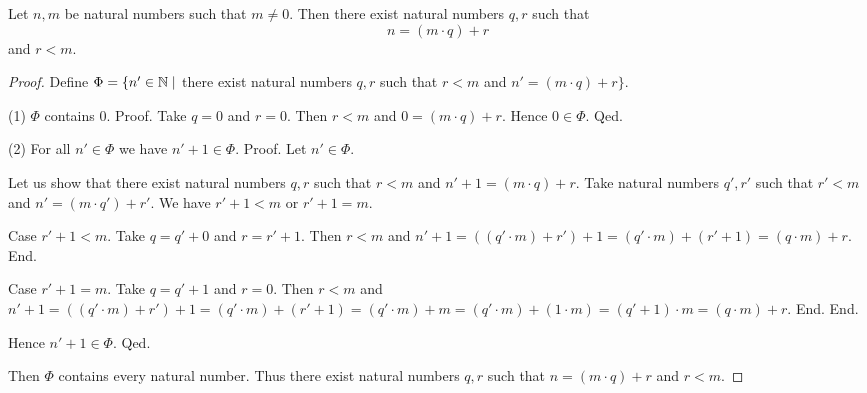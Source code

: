 \documentclass[../arithmetic.tex]{subfiles}
\begin{document}
  \begin{forthel}
    \begin{theorem}
      Let $n, m$ be natural numbers such that $m \neq 0$.
      Then there exist natural numbers $q, r$ such that
      \[ n = (m \cdot q) \plus r \] and $r \less m$.
    \end{theorem}
    \begin{proof}
      Define $\Phi = \{ n' \in \mathbb{N} \mid$ there exist natural numbers $q, r$
      such that $r \less m$ and $n' = (m \cdot q) \plus r \}$.

      (1) $\Phi$ contains $0$.
      Proof.
        Take $q = 0$ and $r = 0$.
        Then $r \less m$ and $0 = (m \cdot q) \plus r$.
        Hence $0 \in \Phi$.
      Qed.

      (2) For all $n' \in \Phi$ we have $n' \plus 1 \in \Phi$.
      Proof.
        Let $n' \in \Phi$.

        Let us show that there exist natural numbers $q, r$ such that $r \less m$
        and $n' \plus 1 = (m \cdot q) \plus r$.
          Take natural numbers $q', r'$ such that $r' \less m$ and
          $n' = (m \cdot q') \plus r'$.
          We have $r' \plus 1 \less m$ or $r' \plus 1 = m$.

          Case $r' \plus 1 \less m$.
            Take $q = q' \plus 0$ and $r = r' \plus 1$. %
            Then $r \less m$ and $n' \plus 1
              = ((q' \cdot m) \plus r') \plus 1
              = (q' \cdot m) \plus (r' \plus 1)
              = (q \cdot m) \plus r$.
          End.

          Case $r' \plus 1 = m$.
            Take  $q = q' \plus 1$ and $r = 0$.
            Then $r \less m$ and
            $n' \plus 1
              = ((q' \cdot m) \plus r') \plus 1
              = (q' \cdot m) \plus (r' \plus 1)
              = (q' \cdot m) \plus m
              = (q' \cdot m) \plus (1 \cdot m)
              = (q' \plus 1) \cdot m
              = (q \cdot m) \plus r$.
          End.
        End.

        Hence $n' \plus 1 \in \Phi$.
      Qed.

      Then $\Phi$ contains every natural number.
      Thus there exist natural numbers $q, r$ such that $n = (m \cdot q) \plus r$
      and $r \less m$.
    \end{proof}
  \end{forthel}
\end{document}
